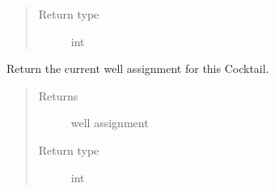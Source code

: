 \documentclass[letterpaper,10pt,english]{sphinxmanual}
\begin{document}
\begin{fulllineitems}
\begin{fulllineitems}
\begin{quote}
\begin{description}
\item[{Return type}] \leavevmode
int

\end{description}\end{quote}

\end{fulllineitems}


\begin{fulllineitems}
\label{\detokenize{polo.crystallography:polo.crystallography.cocktail.Cocktail.well_assignment}}
Return the current well assignment for this Cocktail.
\begin{quote}\begin{description}
\item[{Returns}] \leavevmode
well assignment

\item[{Return type}] \leavevmode
int

\end{description}\end{quote}

\end{fulllineitems}


\end{fulllineitems}

\end{document}
